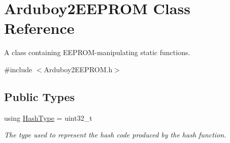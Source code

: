 \hypertarget{classArduboy2EEPROM}{}\section{Arduboy2\+E\+E\+P\+R\+OM Class Reference}
\label{classArduboy2EEPROM}


A {\ttfamily class} containing E\+E\+P\+R\+O\+M-\/manipulating {\ttfamily static} functions.  




{\ttfamily \#include $<$Arduboy2\+E\+E\+P\+R\+O\+M.\+h$>$}

\subsection*{Public Types}
\begin{DoxyCompactItemize}
\item 
\mbox{\label{classArduboy2EEPROM_a58f4ede0b1a6b773e269fd4604e489b7}} 
using \mbox{\hyperlink{classArduboy2EEPROM_a58f4ede0b1a6b773e269fd4604e489b7}{Hash\+Type}} = uint32\+\_\+t
\begin{DoxyCompactList}\small\item\em The type used to represent the hash code produced by the {\ttfamily hash} function. \end{DoxyCompactList}\end{DoxyCompactItemize}
